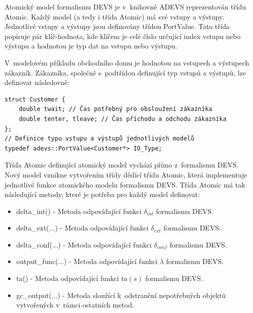 Atomický model formalismu DEVS je v~knihovně ADEVS reprezentován třídu Atomic. Každý model (a tedy i třída Atomic) má své vstupy a výstupy. Jednotlivé vstupy a výstupy jsou definovány třídou PortValue. Tato třída popisuje pár klíč-hodnota, kde klíčem je celé číslo určující index vstupu nebo výstupu a hodnotou je typ dat na vstupu nebo výstupu.

V~modelovém příkladu obchodního domu je hodnotou na vstupech a výstupech zákazník. Zákazníka, společně s~podtřídou definující typ vstupů a výstupů, lze definovat následovně:

\begin{lstlisting}
struct Customer {
    double twait; // Čas potřebný pro obsloužení zákazníka
    double tenter, tleave; // Čas příchodu a odchodu zákazníka
};
// Definice typu vstupu a výstupů jednotlivých modelů
typedef adevs::PortValue<Customer*> IO_Type;
\end{lstlisting}

Třída Atomic definující atomický model vychází přímo z~formalismu DEVS. Nový model vznikne vytvořením třídy dědící třídu Atomic, která implementuje jednotlivé funkce atomického modelu formalismu DEVS. Třída Atomic má tak následující metody, které je potřeba pro každý model definovat:

\begin{itemize}
\item delta\_int() - Metoda odpovídající funkci $\delta_{int}$ formalismu DEVS.
\item delta\_ext(...) - Metoda odpovídající funkci $\delta_{ext}$ formalismu DEVS.
\item delta\_conf(...) - Metoda odpovídající funkci $\delta_{conf}$ formalismu DEVS.
\item output\_func(...) - Metoda odpovídající funkci $\lambda$ formalismu DEVS.
\item ta() - Metoda odpovídající funkci $ta(s)$ formalismu DEVS.
\item gc\_output(...) - Metoda sloužící k~odstranění nepotřebných objektů vytvořených v~rámci ostatních metod.
\end{itemize}

